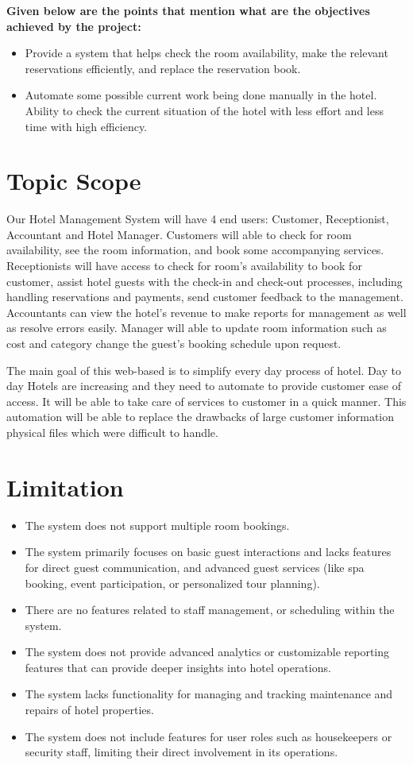     \textbf{Given below are the points that mention what are the objectives achieved by the project:}
    \begin{itemize}
        \item Provide a system that helps check the room availability, make the relevant reservations efficiently, and replace the reservation book.
        \item Automate some possible current work being done manually in the hotel. Ability to check the current situation of the hotel with less effort and less time with high efficiency.
    \end{itemize}
    \section{Topic Scope}
    Our Hotel Management System will have 4 end users: Customer, Receptionist, Accountant and Hotel Manager. Customers will able to check for room availability, see the room information, and book some accompanying services. Receptionists will have access to check for room’s availability to book for customer, assist hotel guests with the check-in and check-out processes, including handling reservations and payments, send customer feedback to the management. Accountants can view the hotel's revenue to make reports for management as well as resolve errors easily. Manager will able to update room information such as cost and category change the guest's booking schedule upon request.
    \vspace{5mm} %
    
    The main goal of this web-based is to simplify every day process of hotel. Day to day Hotels are increasing and they need to automate to provide customer ease of access. It will be able to take care of services to customer in a quick manner. This automation will be able to replace the drawbacks of large customer information physical files which were difficult to handle. 
    \section{Limitation }
    \begin{itemize}
        \item The system does not support multiple room bookings.
        \item The system primarily focuses on basic guest interactions and lacks features for direct guest communication, and advanced guest services (like spa booking, event participation, or personalized tour planning).
        \item  There are no features related to staff management, or scheduling within the system.
        \item The system does not provide advanced analytics or customizable reporting features that can provide deeper insights into hotel operations.
        \item The system lacks functionality for managing and tracking maintenance and repairs of hotel properties.
        \item The system does not include features for user roles such as housekeepers or security staff, limiting their direct involvement in its operations.
    \end{itemize}
